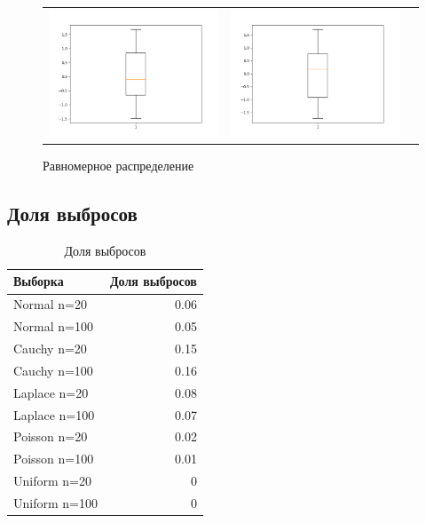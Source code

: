 \begin{figure}[H]
	\centering
	\begin{tabular}{ccc}
		\includegraphics[width=55mm, height =0.25\textheight]{pics/u20.png}
		&
		\includegraphics[width=55mm, height =0.25\textheight]{pics/u100.png}
	\end{tabular}
	\caption{Равномерное распределение}
	\label{fig:uniform}
\end{figure}

\subsection{Доля выбросов}
\begin{table}[H]
	\centering
	\begin{tabular}[t]{lr}
		\hline
		Выборка   &      Доля выбросов		\\
		\hline
		Normal n=20   	&	0.06 				\\
		Normal n=100   	&  	0.05		\\
		Cauchy n=20 	& 	0.15  				\\
		Cauchy n=100	&  	0.16 		\\
		Laplace n=20		& 	0.08  			\\
		Laplace n=100	&  	0.07 		\\
		Poisson n=20	&	0.02 				\\
		Poisson n=100	&	0.01 				\\
		Uniform n=20	&	0 				\\
		Uniform n=100	&	0 				\\
		\hline
	\end{tabular}
	\caption{Доля выбросов}
	\label{tab:normal}
\end{table}

